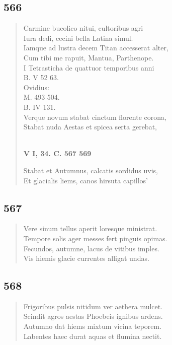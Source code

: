 \documentclass[11pt, a4paper]{report}
\begin{document}
            \subsection*{566}
      \begin{verse}
      Carmine bucolico nitui, cultoribus agri \\ Iura dedi, cecini bella Latina simul. \\ Iamque ad lustra decem Titan accesserat alter, \\ Cum tibi me rapuit, Mantua, Parthenope. \\ I Tetrasticha de quattuor temporibus anni \\ B. V 52 63. \\ Ovidius: \\ M. 493 504. \\ B. IV 131. \\ Verque novum stabat cinctum florente corona, \\ Stabat nuda Aestas et spicea serta gerebat, \\ 
        ﻿\pagebreak 
     \marginpar{[76]} \begin{center} \textbf{V I, 34. C. 567 569} \end{center}Stabat et Autumnus, calcatis sordidus uvis, \\ Et glacialis liems, canos hirsuta capillos’ \\ 
      \end{verse}
  
            \subsection*{567}
      \begin{verse}
      Vere sinum tellus aperit loresque ministrat. \\ Tempore solis ager messes fert pinguis opimas. \\ Fecundos, autumne, lacus de vitibus imples. \\ Vis hiemis glacie currentes alligat undas. \\ 
      \end{verse}
  
            \subsection*{568}
      \begin{verse}
      Frigoribus pulsis nitidum ver aethera mulcet. \\ Scindit agros aestas Phoebeis ignibus ardens. \\ Autumno dat hiems mixtum vicina teporem. \\ Labentes haec durat aquas et flumina nectit. \\ 
      \end{verse}
  
\end{document}
